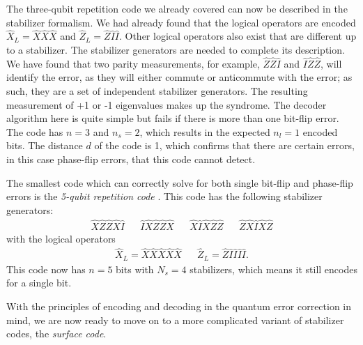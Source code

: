 The three-qubit repetition code we already covered can now be described in the stabilizer formalism. We had already found that the logical operators are encoded $\hat{X}_L = \hat{X}\hat{X}\hat{X}$ and $\hat{Z}_L = \hat{Z}\hat{I}\hat{I}$. Other logical operators also exist that are different up to a stabilizer. The stabilizer generators are needed to complete its description. We have found that two parity measurements, for example, $\hat{Z}\hat{Z}\hat{I}$ and $\hat{I}\hat{Z}\hat{Z}$, will identify the error, as they will either commute or anticommute with the error; as such, they are a set of independent stabilizer generators. The resulting measurement of +1 or -1 eigenvalues makes up the syndrome. The decoder algorithm here is quite simple but fails if there is more than one bit-flip error. The code has $n=3$ and $n_s=2$, which results in the expected $n_l = 1$ encoded bits. The distance $d$ of the code is 1, which confirms that there are certain errors, in this case phase-flip errors, that this code cannot detect.

The smallest code which can correctly solve for both single bit-flip and phase-flip errors is the \emph{5-qubit repetition code} \cite{laflamme1996perfect}. This code has the following stabilizer generators:
\begin{align*}
  \hat{X}\hat{Z}\hat{Z}\hat{X}\hat{I} && \hat{I}\hat{X}\hat{Z}\hat{Z}\hat{X} && \hat{X}\hat{I}\hat{X}\hat{Z}\hat{Z} && \hat{Z}\hat{X}\hat{I}\hat{X}\hat{Z}
\end{align*}
with the logical operators
\begin{align*}
  & \hat{X}_L = \hat{X}\hat{X}\hat{X}\hat{X}\hat{X} && \hat{Z}_L = \hat{Z}\hat{I}\hat{I}\hat{I}\hat{I}. &
\end{align*}
This code now has $n=5$ bits with $N_s = 4$ stabilizers, which means it still encodes for a single bit.

\vspace{1em}
With the principles of encoding and decoding in the quantum error correction in mind, we are now ready to move on to a more complicated variant of stabilizer codes, the \emph{surface code}. 


